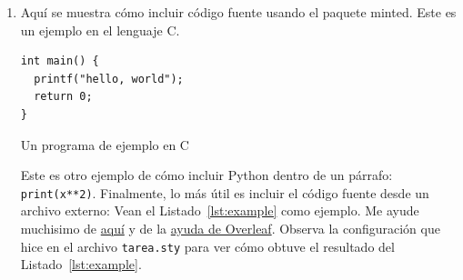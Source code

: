 \begin{enumerate}
\item Aquí se muestra cómo incluir código fuente usando el paquete minted.
Este es un ejemplo en el lenguaje C.
\begin{listing}
\begin{verbatim}
int main() {
  printf("hello, world");
  return 0;
}
\end{verbatim}
\caption{Un programa de ejemplo en C}\label{lst:hello}
\end{listing}

Este es otro ejemplo de cómo incluir Python dentro de un párrafo: \texttt{print(x**2)}.
Finalmente, lo más útil es incluir el código fuente desde un archivo externo: Vean  el Listado~\ref{lst:example} como ejemplo.
Me ayude muchisimo de \href{https://tex.stackexchange.com/questions/252263/alignment-of-minted-line-numbers}{aquí} y de la \href{https://www.overleaf.com/learn/latex/Code_Highlighting_with_minted}{ayuda de Overleaf}.
Observa la configuración que hice en el archivo \verb|tarea.sty| para ver cómo obtuve el resultado del Listado~\ref{lst:example}.


\end{enumerate}
